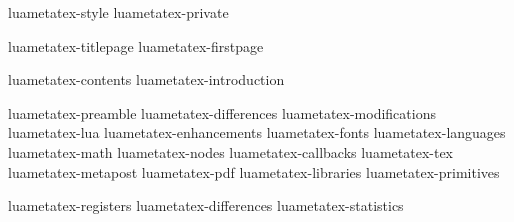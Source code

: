 

%
%






\environment luametatex-style
\environment luametatex-private

\startdocument
  [manual=LuaMeta\TeX,
   version=\cldcontext{status.luatex_verbose}]

\component luametatex-titlepage
\component luametatex-firstpage

\startfrontmatter
    \component luametatex-contents
    \component luametatex-introduction
\stopfrontmatter

\startbodymatter
    \component luametatex-preamble
    \component luametatex-differences
    \component luametatex-modifications
    \component luametatex-lua
    \component luametatex-enhancements
    \component luametatex-fonts
    \component luametatex-languages
    \component luametatex-math
    \component luametatex-nodes
    \component luametatex-callbacks
    \component luametatex-tex
    \component luametatex-metapost
    \component luametatex-pdf
    \component luametatex-libraries
    \component luametatex-primitives
\stopbodymatter

\startbackmatter
    \component luametatex-registers
    \component luametatex-differences
    \component luametatex-statistics
\stopbackmatter

\stopdocument


